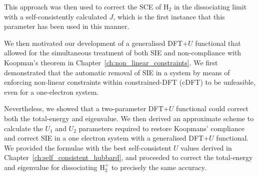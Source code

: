 This approach was then used to correct the SCE  of H$_2$ 
in the dissociating limit with a self-consistently calculated $J$, 
which is the first instance that this parameter has been used in this manner.
%


We then motivated our development of 
a generalised DFT+$U$ functional 
that allowed for the simultaneous treatment  
of both SIE and non-compliance with Koopman's theorem 
in Chapter~\ref{ch:non_linear_constraints}.
%
We first demonstrated that the 
automatic removal of SIE in a system 
by means of enforcing non-linear constraints 
within constrained-DFT (cDFT) to be unfeasible, 
even for a one-electron system.
%

%
Nevertheless, 
we showed that a two-parameter DFT+$U$ functional 
could correct both the total-energy and eigenvalue.
%
We then derived an approximate scheme 
to calculate the $U_1$ and $U_2$ parameters 
required to restore Koopmans' compliance  
and correct SIE in a one electron system 
with a generalised DFT+$U$ functional.
%
We provided the formulae with 
the best self-consistent $U$ values 
derived in Chapter~\ref{ch:self_consistent_hubbard}, 
and proceeded to correct the total-energy 
and eigenvalue for dissociating H$_2^+$ 
to precisely the same accuracy.

